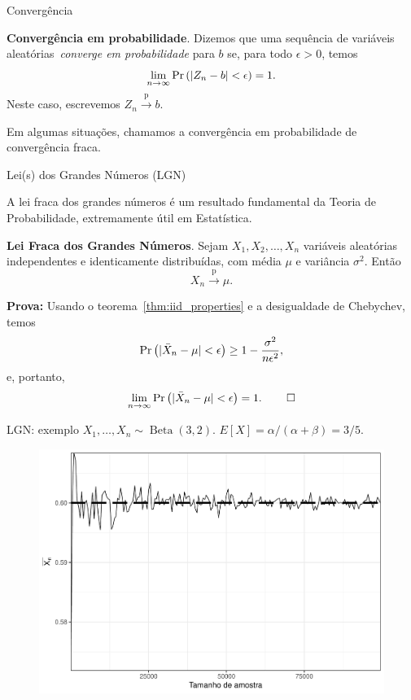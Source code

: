 \begin{frame}{Convergência}
\begin{defn}
\label{defn:weak_convergence}
\textbf{Convergência em probabilidade}.
Dizemos que uma sequência de variáveis aleatórias~\textit{converge em probabilidade} para $b$ se, para todo $\epsilon > 0$, temos
\begin{equation}
 \nonumber
 \lim_{n\to\infty} \operatorname{Pr}\left(|Z_n-b| < \epsilon \right) = 1.
\end{equation}
Neste caso, escrevemos $Z_n \xrightarrow{\text{p}} b$.
\end{defn}
Em algumas situações, chamamos a convergência em probabilidade de convergência fraca.
\end{frame}
\begin{frame}{Lei(s) dos Grandes Números (LGN)}

A lei fraca dos grandes números é um resultado fundamental da Teoria de Probabilidade, extremamente útil em Estatística.
\begin{theo}
\label{thm:WLLN}
\textbf{Lei Fraca dos Grandes Números}.
Sejam  $X_1, X_2, \ldots, X_n$ variáveis aleatórias independentes e identicamente distribuídas, com média $\mu$ e variância $\sigma^2$.
 Então
 $$ X_n \xrightarrow{\text{p}} \mu.$$
\end{theo}
\textbf{Prova:}
Usando o teorema~\ref{thm:iid_properties} e a desigualdade de Chebychev, temos
$$ \operatorname{Pr}\left( |\bar{X}_n - \mu| < \epsilon\right) \geq  1 - \frac{\sigma^2}{n\epsilon^2},$$
e, portanto,
$$ \lim_{n\to\infty} \operatorname{Pr}\left( |\bar{X}_n - \mu| < \epsilon\right) = 1. \: \qed$$
\end{frame}
\begin{frame}{LGN: exemplo}
$X_1, \ldots, X_n \sim \operatorname{Beta}(3, 2)$.
$E[X] = \alpha / (\alpha + \beta) = 3/5$.
\begin{figure}[!ht]
\begin{center}
\includegraphics[scale=0.35]{figures/beta_3_2_LGN.pdf} 
\end{center} 
\end{figure} 
\end{frame}
